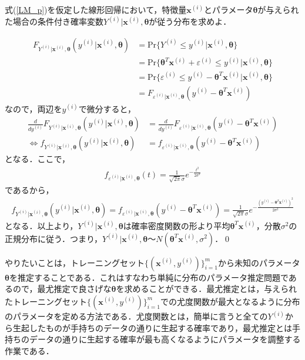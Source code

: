 \begin{qu}
式(\ref{LM_p})を仮定した線形回帰において，特徴量${\bm x}^{(i)}$とパラメータ${\bm \theta}$が与えられた場合の条件付き確率変数$Y^{(i)}|{\bm x}^{(i)},{\bm \theta}$が従う分布を求めよ．
\end{qu}
\begin{ans}
\begin{align*}
F_{Y^{(i)}|{\bm x}^{(i)},{\bm \theta}}(y^{(i)}|{\bm x}^{(i)},{\bm \theta})&=\mathrm{Pr}\{Y^{(i)} \leq y^{(i)}|{\bm x}^{(i)},{\bm \theta}\}	\\
&=\mathrm{Pr}\{{\bm \theta}^T {\bm x}^{(i)}+\varepsilon^{(i)} \leq y^{(i)}|{\bm x}^{(i)},{\bm \theta}\}	\\
&=\mathrm{Pr}\{\varepsilon^{(i)} \leq y^{(i)}-{\bm \theta}^T {\bm x}^{(i)}|{\bm x}^{(i)},{\bm \theta}\}\\
&=F_{\varepsilon^{(i)}|{\bm x}^{(i)},{\bm \theta}}(y^{(i)}-{\bm \theta}^T {\bm x}^{(i)})
\end{align*}
なので，両辺を$y^{(i)}$で微分すると，
\begin{align*}
\frac{d}{dy^{(i)}}F_{Y^{(i)}|{\bm x}^{(i)},{\bm \theta}}(y^{(i)}|{\bm x}^{(i)},{\bm \theta})&=\frac{d}{dy^{(i)}}F_{\varepsilon^{(i)}|{\bm x}^{(i)},{\bm \theta}}(y^{(i)}-{\bm \theta}^T {\bm x}^{(i)})\\
\Longleftrightarrow 　　　f_{Y^{(i)}|{\bm x}^{(i)},{\bm \theta}}(y^{(i)}|{\bm x}^{(i)},{\bm \theta}) &= f_{\varepsilon^{(i)}|{\bm x}^{(i)},{\bm \theta}}(y^{(i)}-{\bm \theta}^T {\bm x}^{(i)})
\end{align*}
となる．ここで，
\begin{align*}
f_{\varepsilon^{(i)}|{\bm x}^{(i)},{\bm \theta}}(t)=\frac{1}{\sqrt{2\pi }\sigma}e^{-\frac{t^2}{2\sigma^2}}	
\end{align*}
であるから，
\begin{align}
f_{Y^{(i)}|{\bm x}^{(i)},{\bm \theta}}(y^{(i)}|{\bm x}^{(i)},{\bm \theta})=f_{\varepsilon^{(i)}|{\bm x}^{(i)},{\bm \theta}}(y^{(i)}-{\bm \theta}^T {\bm x}^{(i)})=\frac{1}{\sqrt{2\pi }\sigma}e^{-\frac{(y^{(i)}-{\bm \theta}^T {\bm x}^{(i)})^2}{2\sigma^2}}	\label{LR_f}
\end{align}
となる．以上より，$Y^{(i)}|{\bm x}^{(i)},{\bm \theta}$は確率密度関数の形より平均${\bm \theta}^T {\bm x}^{(i)}$，分散$\sigma^2$の正規分布に従う．つまり，$Y^{(i)}|{\bm x}^{(i)},{\bm \theta}〜N({\bm \theta}^T {\bm x}^{(i)},\sigma^2)$．\qed 
\end{ans}

やりたいことは，トレーニングセット$\{({\bm x}^{(i)},y^{(i)})\}_{i=1}^m$から未知のパラメータ${\bm \theta}$を推定することである．これはすなわち単純に分布のパラメータ推定問題であるので，最尤推定で良さげな${\bm \theta}$を求めることができる．最尤推定とは，与えられたトレーニングセット$\{({\bm x}^{(i)},y^{(i)})\}_{i=1}^m$での尤度関数が最大となるように分布のパラメータを定める方法である．尤度関数とは，簡単に言うと全ての$Y^{(i)}$から生起したものが手持ちのデータの通りに生起する確率であり，最尤推定とは手持ちのデータの通りに生起する確率が最も高くなるようにパラメータを調整する作業である．

